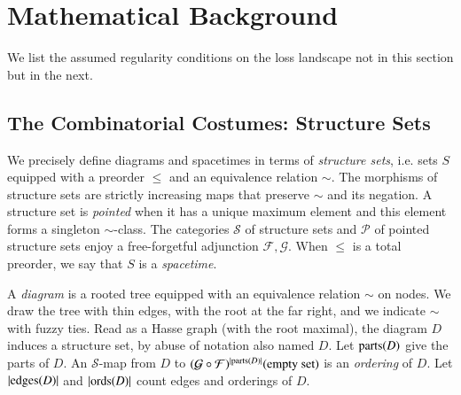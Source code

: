 \documentclass{article}
\newcommand{\Free}{\mathcal{F}}
\newcommand{\Forg}{\mathcal{G}}
\newcommand{\edges}{\text{\textnormal{edges}}}
\newcommand{\ords}{\text{\textnormal{ords}}}
\newcommand{\parts}{\text{\textnormal{parts}}}
\newcommand{\Pp}{\mathcal{P}}
\newcommand{\Ss}{\mathcal{S}}
\begin{document}

\newpage
    
    


\renewcommand{\thesection}{\Alph{section}}
\setcounter{section}{0}

\section{Mathematical Background} \label{sect:morebackground}
    We list the assumed regularity conditions on the loss landscape not in this
    section but in the next.

    \subsection{The Combinatorial Costumes: Structure Sets}
        We precisely define diagrams and spacetimes in terms of \emph{structure
        sets}, i.e. sets $S$ equipped with a preorder $\leq$ and an equivalence
        relation $\sim$.  The morphisms of structure sets are strictly
        increasing maps that preserve $\sim$ and its negation.  A structure set
        is \emph{pointed} when it has a unique maximum element and this element
        forms a singleton $\sim$-class.  The categories $\Ss$ of structure sets
        and $\Pp$ of pointed structure sets enjoy a free-forgetful adjunction
        $\Free, \Forg$.  When $\leq$ is a total preorder, we say that $S$ is a
        \emph{spacetime}.
    
        A \emph{diagram} is a rooted tree equipped with an equivalence relation
        $\sim$ on nodes.  We draw the tree with thin edges, with the root at
        the far right, and we indicate $\sim$ with fuzzy ties.  Read as a Hasse
        graph (with the root maximal), the diagram $D$ induces a structure set,
        by abuse of notation also named $D$.  Let $\parts(D)$ give the parts of
        $D$.  An $\Ss$-map from $D$ to
        $
            (\Forg\circ\Free)^{|\parts(D)|}(\text{empty set})
        $
        is an \emph{ordering} of $D$.  Let $|\edges(D)|$ and $|\ords(D)|$ count
        edges and orderings of $D$.
    
\end{document}
